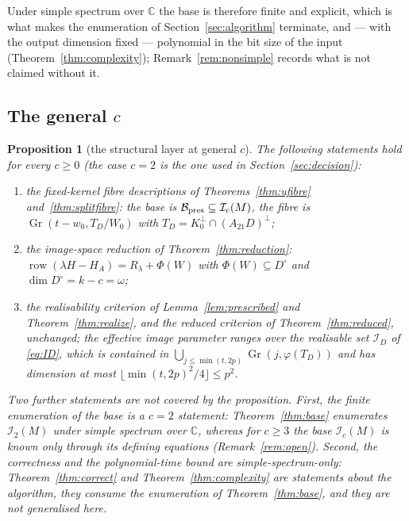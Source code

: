 \documentclass[journal]{IEEEtran}
\theoremstyle{plainn}
\newtheorem{prop}[thm]{Proposition}
\theoremstyle{remark}
\newcommand{\row}{\operatorname{row}}
\newcommand{\Gr}{\operatorname{Gr}}
\begin{document}
Under simple spectrum over $\mathbb C$ the base is therefore finite and explicit, which is what makes the
enumeration of Section~\ref{sec:algorithm} terminate, and --- with the output dimension fixed ---
polynomial in the bit size of the input (Theorem~\ref{thm:complexity}); Remark~\ref{rem:nonsimple}
records what is not claimed without it.

\subsection{The general \texorpdfstring{$c$}{c}}\label{sec:base:b}

\begin{prop}[the structural layer at general $c$]\label{prop:general}
The following statements hold for every $c\ge0$ (the case $c=2$ is the one used in
Section~\ref{sec:decision}):
\begin{enumerate}[label=(\roman*),leftmargin=*,itemsep=1pt,topsep=2pt]
\item the fixed-kernel fibre descriptions of Theorems~\ref{thm:ufibre} and~\ref{thm:splitfibre}: the base
is $\mathcal B_{\rm pres}\subseteq\mathcal I_c(M)$, the fibre is $\Gr(t-w_0,T_D/W_0)$ with
$T_D=K_0^\perp\cap(A_{21}D)^\perp$;
\item the image-space reduction of Theorem~\ref{thm:reduction}:
$\row(\lambda H-H_A)=R_\lambda+\Phi(W)$ with $\Phi(W)\subseteq D^\circ$ and $\dim D^\circ=k-c=\omega$;
\item the realisability criterion of Lemma~\ref{lem:prescribed} and Theorem~\ref{thm:realize}, and the
reduced criterion of Theorem~\ref{thm:reduced}, unchanged; the effective image parameter ranges over the
realisable set $\mathcal I_D$ of \eqref{eq:ID}, which is contained in
$\bigcup_{j\le\min(t,2p)}\Gr(j,\varphi(T_D))$ and has dimension at most
$\lfloor\min(t,2p)^2/4\rfloor\le p^2$.
\end{enumerate}
Two further statements are \emph{not} covered by the proposition. First, the finite enumeration of the
base is a $c=2$ statement: Theorem~\ref{thm:base} enumerates $\mathcal I_2(M)$ under simple spectrum over
$\mathbb C$, whereas for $c\ge3$ the base $\mathcal I_c(M)$ is known only through its defining equations
(Remark~\ref{rem:open}). Second, the correctness and the polynomial-time bound are simple-spectrum-only:
Theorem~\ref{thm:correct} and Theorem~\ref{thm:complexity} are statements about the algorithm, they
consume the enumeration of Theorem~\ref{thm:base}, and they are \emph{not} generalised here.
\end{prop}
\end{document}

